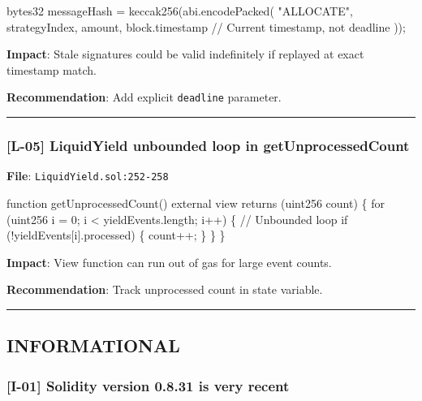 \documentclass[
]{article}
\newenvironment{Shaded}{}{}
\newcommand{\NormalTok}[1]{#1}
\begin{document}
\begin{Shaded}
\begin{Highlighting}[]
\NormalTok{bytes32 messageHash = keccak256(abi.encodePacked(}
\NormalTok{    "ALLOCATE",}
\NormalTok{    strategyIndex,}
\NormalTok{    amount,}
\NormalTok{    block.timestamp  // Current timestamp, not deadline}
\NormalTok{));}
\end{Highlighting}
\end{Shaded}

\textbf{Impact}: Stale signatures could be valid indefinitely if
replayed at exact timestamp match.

\textbf{Recommendation}: Add explicit \texttt{deadline} parameter.

\begin{center}\rule{0.5\linewidth}{0.5pt}\end{center}

\subsubsection{{[}L-05{]} LiquidYield unbounded loop in
getUnprocessedCount}\label{l-05-liquidyield-unbounded-loop-in-getunprocessedcount}

\textbf{File}: \texttt{LiquidYield.sol:252-258}

\begin{Shaded}
\begin{Highlighting}[]
\NormalTok{function getUnprocessedCount() external view returns (uint256 count) \{}
\NormalTok{    for (uint256 i = 0; i \textless{} yieldEvents.length; i++) \{  // Unbounded loop}
\NormalTok{        if (!yieldEvents[i].processed) \{}
\NormalTok{            count++;}
\NormalTok{        \}}
\NormalTok{    \}}
\NormalTok{\}}
\end{Highlighting}
\end{Shaded}

\textbf{Impact}: View function can run out of gas for large event
counts.

\textbf{Recommendation}: Track unprocessed count in state variable.

\begin{center}\rule{0.5\linewidth}{0.5pt}\end{center}

\subsection{INFORMATIONAL}\label{informational}

\subsubsection{{[}I-01{]} Solidity version 0.8.31 is very
recent}\label{i-01-solidity-version-0831-is-very-recent}
\end{document}
